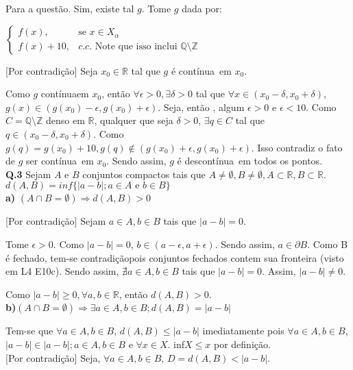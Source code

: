 \documentclass[12pt,twoside]{article}
\newcommand{\defi}{definição}
\newcommand{\ent}{então }
\newcommand{\eh}{é }
\newcommand{\cont}{contínua}
\newcommand{\contradicao}{contradição}
\newcommand{\R}{\mathbb{R}}
\begin{document}
	Para a questão. Sim, existe tal $g$. Tome $g$ dada por:
	
	$
	\begin{cases}
		f(x), &\text{se } x \in X_\alpha\\
		f(x) + 10, &c.c.\text{ Note que isso inclui } \mathbb{Q}\setminus\mathbb{Z}
	\end{cases}
	$
	
	[Por \contradicao] Seja $x_0 \in \R$ tal que $g$ \eh \cont\ em $x_0$.
	
	Como $g$ \cont em $x_0$, \ent $\forall \epsilon > 0, \exists \delta > 0$ tal que $\forall x \in (x_0 - \delta, x_0 + \delta)$, \hbox{$g(x) \in (g(x_0) - \epsilon, g(x_0) + \epsilon)$}. Seja, \ent, algum $\epsilon > 0$ e $\epsilon < 10$. Como $C = \mathbb{Q}\setminus\mathbb{Z}$ denso em $\R$, qualquer que seja $\delta > 0$, $\exists q \in C$ tal que $q \in (x_0 - \delta, x_0 + \delta)$. Como $g(q) = g(x_0) + 10, g(q)\notin (g(x_0) + \epsilon, g(x_0) + \epsilon)$. Isso contradiz o fato de $g$ ser \cont\ em $x_0$. Sendo assim, $g$ \eh des\cont\ em todos os pontos.\\
	
	
	\noindent\textbf{Q.3} Sejam $A$ e $B$ conjuntos compactos tais que $A \neq \emptyset, B \neq \emptyset, A \subset \R, B \subset \R$. $d(A,B) = inf\{|a-b|; a\in A \text{ e } b\in B\}$\\
	
	
	\noindent\textbf{a)} $(A \cap B = \emptyset) \Rightarrow d(A,B)>0$
	
	[Por \contradicao]
	Sejam $a \in A, b\in B$ tais que $|a-b| = 0$.
	
	Tome $\epsilon > 0$. Como $|a-b| = 0$, $b\in (a-\epsilon, a+\epsilon)$. Sendo assim, $a \in \partial B$. Como B \eh fechado, tem-se \contradicao pois conjuntos fechados contem sua fronteira (visto em L4 E10c). Sendo assim, $\nexists a \in A, b \in B$ tais que $|a-b| = 0$. Assim, $|a-b| \neq 0$.
	
	Como $|a-b| \ge 0, \forall a, b \in \R$, \ent $d(A,B)>0$.\\


	\noindent\textbf{b)}$(A \cap B = \emptyset) \Rightarrow \exists a\in A, b \in B; d(A,B)=|a-b|$
	
	Tem-se que $\forall a\in A, b\in B$, $d(A,B) \leq |a-b|$ imediatamente pois $\forall a\in A, b\in B$, $|a-b| \in {|a-b|; a\in A, b\in B}$ e $\forall x \in X$. inf$X \leq x$ por \defi.\\
	
	[Por \contradicao] Seja, $\forall a\in A, b\in B$, $D = d(A,B) < |a-b|$.
	
\end{document}
